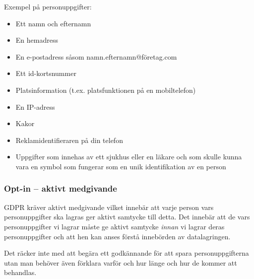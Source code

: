 Exempel på personuppgifter:
\begin{itemize}
    \item Ett namn och efternamn
    \item En hemadress
    \item En e-postadress såsom namn.efternamn@företag.com
    \item Ett id-kortsnummer
    \item Platsinformation (t.ex. platsfunktionen på en mobiltelefon)
    \item En IP-adress
    \item Kakor
    \item Reklamidentifieraren på din telefon
    \item Uppgifter som innehas av ett sjukhus eller en läkare och som skulle kunna vara en symbol som fungerar som en unik identifikation av en person
\end{itemize}

\subsubsection{Opt-in – aktivt medgivande}
GDPR kräver aktivt medgivande vilket innebär att varje person vars personuppgifter ska
lagras ger aktivt samtycke till detta. Det innebär att de vars personuppgifter vi lagrar
måste ge aktivt samtycke \textit{innan} vi lagrar deras personuppgifter och att hen kan anses
förstå innebörden av datalagringen.

Det räcker inte med att begära ett godkännande för att spara personuppgifterna utan man behöver även förklara varför och hur länge och hur de kommer att behandlas.

